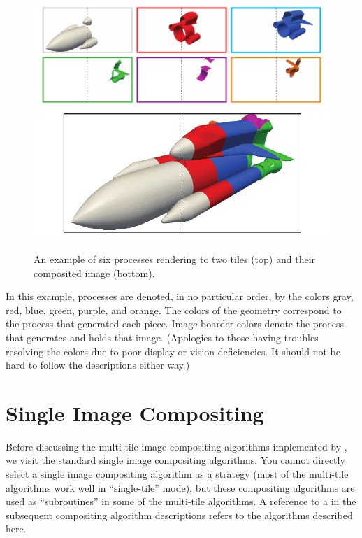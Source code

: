 \begin{figure}
  \centering
  \includegraphics{images/AllInput}
  \includegraphics{images/CompositedInput}
  \caption[Example compositing problem.]{An example of six processes
    rendering to two tiles (top) and their composited image (bottom).}
  \label{fig:ExampleInputs}
\end{figure}

In this example, processes are denoted, in no particular order, by the
colors gray, red, blue, green, purple, and orange.  The colors of the
geometry correspond to the process that generated each piece.  Image
boarder colors denote the process that generates and holds that image.
(Apologies to those having troubles resolving the colors due to poor
display or vision deficiencies.  It should not be hard to follow the
descriptions either way.)

\section{Single Image Compositing}


Before discussing the multi-tile image compositing algorithms implemented
by \IceT, we visit the standard single image compositing algorithms.  You
cannot directly select a single image compositing algorithm as a strategy
(most of the multi-tile algorithms work well in ``single-tile'' mode), but
these compositing algorithms are used as ``subroutines'' in some of the
multi-tile algorithms.  A reference to a
 in the subsequent compositing algorithm descriptions refers to
the algorithms described here.

